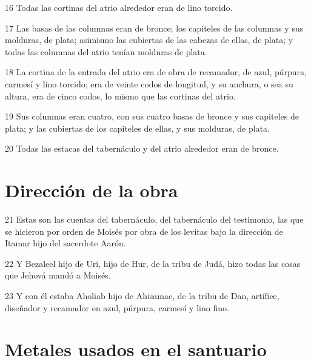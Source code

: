 \par 16 Todas las cortinas del atrio alrededor eran de lino torcido.
\par 17 Las basas de las columnas eran de bronce; los capiteles de las columnas y sus molduras, de plata; asimismo las cubiertas de las cabezas de ellas, de plata; y todas las columnas del atrio tenían molduras de plata.
\par 18 La cortina de la entrada del atrio era de obra de recamador, de azul, púrpura, carmesí y lino torcido; era de veinte codos   de longitud, y su anchura, o sea su altura, era de cinco codos, lo mismo que las cortinas del atrio.
\par 19 Sus columnas eran cuatro, con sus cuatro basas de bronce y sus capiteles de plata; y las cubiertas de los capiteles de ellas, y sus molduras, de plata.
\par 20 Todas las estacas del tabernáculo y del atrio alrededor eran de bronce.

\section*{Dirección de la obra}

\par 21 Estas son las cuentas del tabernáculo, del tabernáculo del testimonio, las que se hicieron por orden de Moisés por obra de los levitas bajo la dirección de Itamar hijo del sacerdote Aarón.
\par 22 Y Bezaleel hijo de Uri, hijo de Hur, de la tribu de Judá, hizo todas las cosas que Jehová mandó a Moisés.
\par 23 Y con él estaba Aholiab hijo de Ahisamac, de la tribu de Dan, artífice, diseñador y recamador en azul, púrpura, carmesí y lino fino.

\section*{Metales usados en el santuario}

